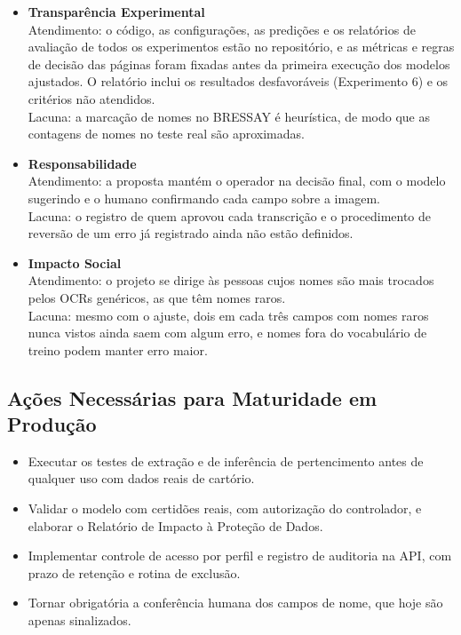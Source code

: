 \documentclass[12pt,a4paper]{article}
\begin{document}
\begin{itemize}
    \item \textbf{Transparência Experimental} \\
    Atendimento: o código, as configurações, as predições e os relatórios de avaliação de todos os experimentos estão no repositório, e as métricas e regras de decisão das páginas foram fixadas antes da primeira execução dos modelos ajustados. O relatório inclui os resultados desfavoráveis (Experimento 6) e os critérios não atendidos. \\
    Lacuna: a marcação de nomes no BRESSAY é heurística, de modo que as contagens de nomes no teste real são aproximadas.

    \item \textbf{Responsabilidade} \\
    Atendimento: a proposta mantém o operador na decisão final, com o modelo sugerindo e o humano confirmando cada campo sobre a imagem. \\
    Lacuna: o registro de quem aprovou cada transcrição e o procedimento de reversão de um erro já registrado ainda não estão definidos.

    \item \textbf{Impacto Social} \\
    Atendimento: o projeto se dirige às pessoas cujos nomes são mais trocados pelos OCRs genéricos, as que têm nomes raros. \\
    Lacuna: mesmo com o ajuste, dois em cada três campos com nomes raros nunca vistos ainda saem com algum erro, e nomes fora do vocabulário de treino podem manter erro maior.
\end{itemize}

\subsection{Ações Necessárias para Maturidade em Produção}

\begin{itemize}
    \item Executar os testes de extração e de inferência de pertencimento antes de qualquer uso com dados reais de cartório.
    \item Validar o modelo com certidões reais, com autorização do controlador, e elaborar o Relatório de Impacto à Proteção de Dados.
    \item Implementar controle de acesso por perfil e registro de auditoria na API, com prazo de retenção e rotina de exclusão.
    \item Tornar obrigatória a conferência humana dos campos de nome, que hoje são apenas sinalizados.
\end{itemize}
\end{document}
